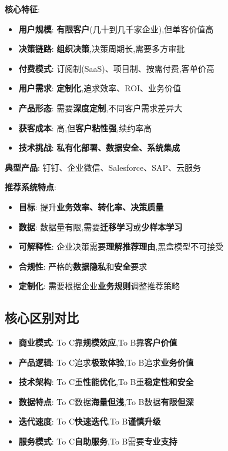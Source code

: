 \documentclass[UTF8]{ctexart}
\begin{document}
\textbf{核心特征}:
\begin{itemize}
    \item \textbf{用户规模}: \textbf{有限客户}(几十到几千家企业),但单客价值高
    \item \textbf{决策链路}: \textbf{组织决策},决策周期长,需要多方审批
    \item \textbf{付费模式}: 订阅制(SaaS)、项目制、按需付费,客单价高
    \item \textbf{用户需求}: \textbf{定制化},追求效率、ROI、业务价值
    \item \textbf{产品形态}: 需要\textbf{深度定制},不同客户需求差异大
    \item \textbf{获客成本}: 高,但\textbf{客户粘性强},续约率高
    \item \textbf{技术挑战}: \textbf{私有化部署、数据安全、系统集成}
\end{itemize}

\textbf{典型产品}: 钉钉、企业微信、Salesforce、SAP、云服务

\textbf{推荐系统特点}:
\begin{itemize}
    \item \textbf{目标}: 提升\textbf{业务效率、转化率、决策质量}
    \item \textbf{数据}: 数据量有限,需要\textbf{迁移学习}或\textbf{少样本学习}
    \item \textbf{可解释性}: 企业决策需要\textbf{理解推荐理由},黑盒模型不可接受
    \item \textbf{合规性}: 严格的\textbf{数据隐私}和\textbf{安全}要求
    \item \textbf{定制化}: 需要根据企业\textbf{业务规则}调整推荐策略
\end{itemize}

\subsection{核心区别对比}

\begin{itemize}
    \item \textbf{商业模式}: To C靠\textbf{规模效应},To B靠\textbf{客户价值}
    \item \textbf{产品逻辑}: To C追求\textbf{极致体验},To B追求\textbf{业务价值}
    \item \textbf{技术架构}: To C重\textbf{性能优化},To B重\textbf{稳定性和安全}
    \item \textbf{数据特点}: To C数据\textbf{海量但浅},To B数据\textbf{有限但深}
    \item \textbf{迭代速度}: To C\textbf{快速迭代},To B\textbf{谨慎升级}
    \item \textbf{服务模式}: To C\textbf{自助服务},To B需要\textbf{专业支持}
\end{itemize}
\end{document}

